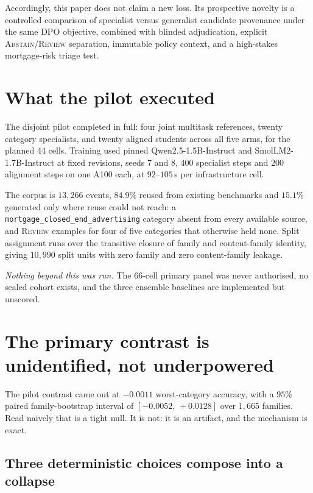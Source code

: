 \documentclass[10pt]{article}
\newcommand{\review}{\textsc{Review}}
\newcommand{\abstain}{\textsc{Abstain}}
\begin{document}
Accordingly, this paper does not claim a new loss. Its prospective novelty is a
controlled comparison of specialist versus generalist candidate provenance
under the same DPO objective, combined with blinded adjudication, explicit
\abstain/\review{} separation, immutable policy context, and a high-stakes
mortgage-risk triage test.

\section{What the pilot executed}

The disjoint pilot completed in full: four joint multitask references, twenty
category specialists, and twenty aligned students across all five arms, for the
planned 44 cells. Training used pinned Qwen2.5-1.5B-Instruct and
SmolLM2-1.7B-Instruct at fixed revisions, seeds $7$ and $8$, $400$ specialist steps
and $200$ alignment steps on one A100 each, at $92$--$105$\,s per infrastructure cell.

The corpus is $13{,}266$ events, $84.9\%$ reused from existing benchmarks and $15.1\%$
generated only where reuse could not reach: a \texttt{mortgage\_closed\_end\_advertising}
category absent from every available source, and \review{} examples for four of five
categories that otherwise held none. Split assignment runs over the transitive closure
of family and content-family identity, giving $10{,}990$ split units with zero family
and zero content-family leakage.

\emph{Nothing beyond this was run.} The 66-cell primary panel was never authorised,
no sealed cohort exists, and the three ensemble baselines are implemented but unscored.

\section{The primary contrast is unidentified, not underpowered}
\label{sec:identifiability}

The pilot contrast came out at $-0.0011$ worst-category accuracy, with a $95\%$ paired
family-bootstrap interval of $[-0.0052,\,+0.0128]$ over $1{,}665$ families. Read naively
that is a tight null. It is not: it is an artifact, and the mechanism is exact.

\subsection{Three deterministic choices compose into a collapse}
\end{document}
